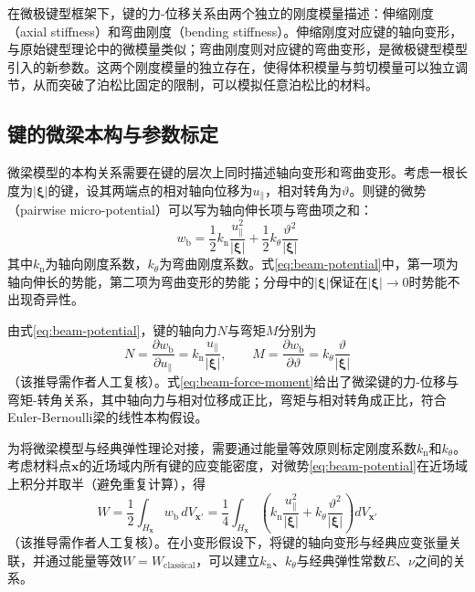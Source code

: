 在微极键型框架下，键的力-位移关系由两个独立的刚度模量描述：伸缩刚度（axial stiffness）和弯曲刚度（bending stiffness）。伸缩刚度对应键的轴向变形，与原始键型理论中的微模量类似；弯曲刚度则对应键的弯曲变形，是微极键型模型引入的新参数。这两个刚度模量的独立存在，使得体积模量与剪切模量可以独立调节，从而突破了泊松比固定的限制，可以模拟任意泊松比的材料。


\subsection{键的微梁本构与参数标定}\label{sec:beam-constitutive}

微梁模型的本构关系需要在键的层次上同时描述轴向变形和弯曲变形。考虑一根长度为$|\boldsymbol{\xi}|$的键，设其两端点的相对轴向位移为$u_{\parallel}$，相对转角为$\vartheta$。则键的微势（pairwise micro-potential）可以写为轴向伸长项与弯曲项之和：
\begin{equation}
  w_{\mathrm{b}}=\frac{1}{2}k_{\mathrm{n}}\frac{u_{\parallel}^{2}}{|\boldsymbol{\xi}|}+\frac{1}{2}k_{\theta}\frac{\vartheta^{2}}{|\boldsymbol{\xi}|}
  \label{eq:beam-potential}
\end{equation}
其中$k_{\mathrm{n}}$为轴向刚度系数，$k_{\theta}$为弯曲刚度系数。式\eqref{eq:beam-potential}中，第一项为轴向伸长的势能，第二项为弯曲变形的势能；分母中的$|\boldsymbol{\xi}|$保证在$|\boldsymbol{\xi}|\to 0$时势能不出现奇异性。

由式\eqref{eq:beam-potential}，键的轴向力$N$与弯矩$M$分别为
\begin{equation}
  N=\frac{\partial w_{\mathrm{b}}}{\partial u_{\parallel}}=k_{\mathrm{n}}\frac{u_{\parallel}}{|\boldsymbol{\xi}|},
  \qquad
  M=\frac{\partial w_{\mathrm{b}}}{\partial \vartheta}=k_{\theta}\frac{\vartheta}{|\boldsymbol{\xi}|}
  \label{eq:beam-force-moment}
\end{equation}
（该推导需作者人工复核）。式\eqref{eq:beam-force-moment}给出了微梁键的力-位移与弯矩-转角关系，其中轴向力与相对位移成正比，弯矩与相对转角成正比，符合Euler-Bernoulli梁的线性本构假设。

为将微梁模型与经典弹性理论对接，需要通过能量等效原则标定刚度系数$k_{\mathrm{n}}$和$k_{\theta}$。考虑材料点$\mathbf{x}$的近场域内所有键的应变能密度，对微势\eqref{eq:beam-potential}在近场域上积分并取半（避免重复计算），得
\begin{equation}
  W=\frac{1}{2}\int_{H_{\mathbf{x}}}w_{\mathrm{b}}\,dV_{\mathbf{x}'}=
  \frac{1}{4}\int_{H_{\mathbf{x}}}\left(k_{\mathrm{n}}\frac{u_{\parallel}^{2}}{|\boldsymbol{\xi}|}+k_{\theta}\frac{\vartheta^{2}}{|\boldsymbol{\xi}|}\right)dV_{\mathbf{x}'}
  \label{eq:beam-strain-energy}
\end{equation}
（该推导需作者人工复核）。在小变形假设下，将键的轴向变形与经典应变张量关联，并通过能量等效$W=W_{\mathrm{classical}}$，可以建立$k_{\mathrm{n}}$、$k_{\theta}$与经典弹性常数$E$、$\nu$之间的关系。

